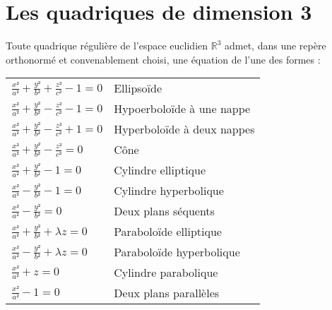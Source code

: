 

\section{Les quadriques de dimension 3}

Toute quadrique régulière de l'espace euclidien $\mathbb{R}^3$ admet, dans une repère orthonormé et convenablement choisi, une équation de l'une des formes :\\ 

\begin{tabular}{l l}
 $\frac{x²}{a²}+\frac{y²}{b²}+\frac{z²}{c²}-1=0$ & Ellipsoïde \\
 $\frac{x²}{a²}+\frac{y²}{b²}-\frac{z²}{c²}-1=0$ & Hypoerboloïde à une nappe \\
 $\frac{x²}{a²}+\frac{y²}{b²}-\frac{z²}{c²}+1=0$ & Hyperboloïde à deux nappes\\
 $\frac{x²}{a²}+\frac{y²}{b²}-\frac{z²}{c²}=0$   & Cône \\
 $\frac{x²}{a²}+\frac{y²}{b²}-1=0$ & Cylindre elliptique \\
 $\frac{x²}{a²}-\frac{y²}{b²}-1=0$ & Cylindre hyperbolique \\
 $\frac{x²}{a²}-\frac{y²}{b²}=0$ & Deux plans séquents \\
 $\frac{x²}{a²}+\frac{y²}{b²}+\lambda z = 0$ & Paraboloïde elliptique \\
 $\frac{x²}{a²}-\frac{y²}{b²}+\lambda z = 0$ & Paraboloïde hyperbolique  \\
 $\frac{x²}{a²}+z = 0$ & Cylindre parabolique \\
 $\frac{x²}{a²}-1 =0$ & Deux plans parallèles \\ 
\end{tabular}




